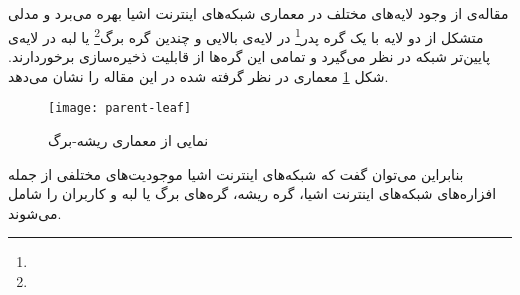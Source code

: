 

\subsection{}

مقاله‌ی \cite{wu2022deep} از وجود لایه‌های مختلف در معماری شبکه‌های اینترنت اشیا بهره می‌برد و مدلی متشکل از دو لایه با یک گره پدر\footnote{} در لایه‌ی بالایی و چندین گره برگ\footnote{} یا لبه در لایه‌ی پایین‌تر شبکه در نظر می‌گیرد و تمامی این گره‌ها از قابلیت ذخیره‌سازی برخوردارند. شکل \ref{fig:parent-leaf} معماری در نظر گرفته شده در این مقاله را نشان می‌دهد.

\begin{figure}[ht]
	\centerline{\texttt{[image: parent-leaf]}}
	\caption{نمایی از معماری ریشه-برگ}
	\label{fig:parent-leaf}
\end{figure}

بنابراین می‌توان گفت که شبکه‌های اینترنت اشیا موجودیت‌های مختلفی از جمله افزاره‌های شبکه‌های اینترنت اشیا، گره ریشه، گره‌های برگ یا لبه و کاربران را شامل می‌شوند. 

